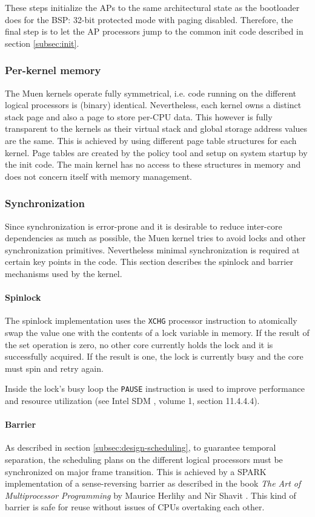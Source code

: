 These steps initialize the APs to the same architectural state as the
bootloader does for the BSP: 32-bit protected mode with paging disabled.
Therefore, the final step is to let the AP processors jump to the common init
code described in section \ref{subsec:init}.

\subsubsection{Per-kernel memory}
The Muen kernels operate fully symmetrical, i.e. code running on the different
logical processors is (binary) identical. Nevertheless, each kernel owns a
distinct stack page and also a page to store per-CPU data. This however is fully
transparent to the kernels as their virtual stack and global storage address
values are the same. This is achieved by using different page table structures
for each kernel. Page tables are created by the policy tool and setup on system
startup by the init code. The main kernel has no access to these structures in
memory and does not concern itself with memory management.

\subsubsection{Synchronization} Since synchronization is error-prone and it is
desirable to reduce inter-core dependencies as much as possible, the Muen
kernel tries to avoid locks and other synchronization primitives. Nevertheless
minimal synchronization is required at certain key points in the code. This
section describes the spinlock and barrier mechanisms used by the kernel.

\paragraph{Spinlock}
The spinlock implementation uses the \texttt{XCHG} processor instruction to
atomically swap the value one with the contents of a lock variable in memory.
If the result of the set operation is zero, no other core currently holds the
lock and it is successfully acquired. If the result is one, the lock is
currently busy and the core must spin and retry again.

Inside the lock's busy loop the \texttt{PAUSE} instruction is used to improve
performance and resource utilization (see Intel SDM \cite{IntelSDM}, volume 1,
section 11.4.4.4).

\paragraph{Barrier}
As described in section \ref{subsec:design-scheduling}, to guarantee temporal
separation, the scheduling plans on the different logical processors must be
synchronized on major frame transition. This is achieved by a SPARK
implementation of a sense-reversing barrier as described in the book \emph{The
Art of Multiprocessor Programming} by Maurice Herlihy and Nir Shavit
\cite{Herlihy:2008:AMP:1734069}. This kind of barrier is safe for reuse without
issues of CPUs overtaking each other.
